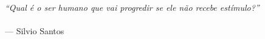\begin{epigrafe}
    \vspace*{\fill}
  \begin{flushright}

	\textit{``Qual é o ser humano que vai progredir se ele não recebe estímulo?''} \\ ~ \\
	--- Silvio Santos

  \end{flushright}
\end{epigrafe}